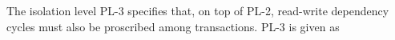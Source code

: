 \documentclass[acmlarge, ,11pt]{acmart}
\begin{document}
 The isolation level  PL-3 specifies that, on top of PL-2,  read-write dependency cycles \cite{DBLP:conf/icde/AdyaLO00}
  must also be proscribed among transactions. PL-3 is given as
 \begin{align}\label{eqn:PL3}
\begin{split}

\end{split}
\end{align}
\end{document}

